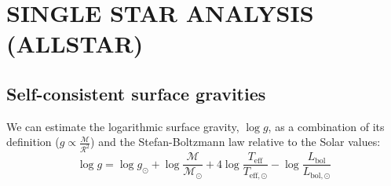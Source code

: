 \documentclass[
  journal=pasa,
  manuscript=research-paper, %
  year=2023,
  volume=37
]{cup-journal}
\begin{document}
%
%

\newpage
\section{SINGLE STAR ANALYSIS (ALLSTAR)}
\label{sec:allstar_analysis}


\subsection{Self-consistent surface gravities}

We can estimate the logarithmic surface gravity, $\log g$, as a combination of its definition ($g \propto \frac{\mathcal{M}}{\mathcal{R}^2}$) and the Stefan-Boltzmann law relative to the Solar values:
\begin{equation}
\log g = \log g_\odot + \log \frac{\mathcal{M}}{\mathcal{M_\odot}} + 4 \log \frac{T_\mathrm{eff}}{T_\mathrm{eff,\odot}} - \log \frac{L_\mathrm{bol}}{L_\mathrm{bol,\odot}} \label{eq:logg}
\end{equation}
\end{document}
